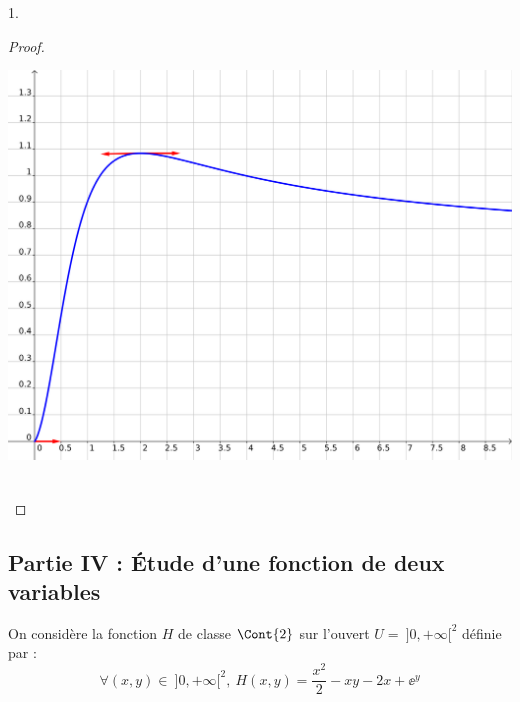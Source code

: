 \documentclass[11pt]{article}%
\begin{document}
\begin{noliste}{1.}
\begin{proof}
\begin{center}
      
\includegraphics[scale=.25]{Figures/EML_2018/geogebra_EML_2018.png}
      
    \end{center}
    
    ~\\[-1.4cm]
  \end{proof}
\end{noliste}




\subsection*{Partie IV : Étude d'une fonction de deux variables}

\noindent
On considère la fonction $H$ de classe $\Cont{2}$ sur l'ouvert $U = \
]0,+\infty[^2$ définie par :
\[
  \forall (x,y) \in \ ]0,+\infty[^2, \ H(x,y) = \dfrac{x^2}{2} -xy-2x 
  + \ee^y
\]
\end{document}
